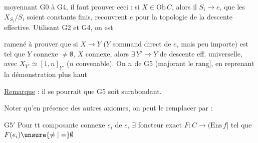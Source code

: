 
 moyennant G0 à G4, il faut prouver ceci : si $X\in\mathrm{Ob}\,C$, alors il   $S_i\longrightarrow e$,  que les $X_{S_i}/S_i$ soient constants finis, recouvrent $e$ pour la topologie de la descente effective. Utilisant G2 et G4, on est

       

ramené à prouver que si $X\longrightarrow Y$ ($Y$ sommand direct de $e$, mais peu importe) est tel que $Y$ connexe $\ne\emptyset$,  $X$ connexe, alors $\exists\,Y'\longrightarrow Y$ de descente eff. universelle, avec $X_{Y'}\simeq[1,n]_{Y'}$ ($n$ convenable). On   $n$ de G5 (majorant le rang], en reprenant la démonstration plus haut

\uline{Remarque} : il se pourrait que G5 soit surabondant.

Noter qu'en présence des autres axiomes, on peut le remplacer par :

G5$'$  Pour tt composante connexe $e_i$ de $e$, $\exists$ foncteur exact $F:C\longrightarrow(\mathrm{Ens}\,f]$ tel que $F(e_i)\unsure{\ne|=}\emptyset$

